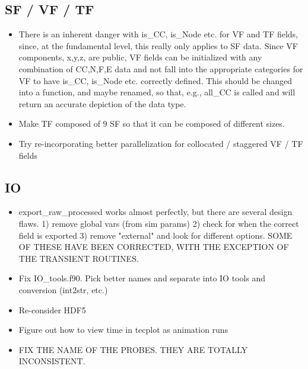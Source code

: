 \documentclass[11pt]{article}
\begin{document}
\subsection{SF / VF / TF}
\begin{itemize}
\setlength\itemsep{-1em}
\item There is an inherent danger with is\_CC, is\_Node etc. for VF and TF fields, since, at the fundamental level, this really only applies to SF data. Since VF components, x,y,z, are public, VF fields can be initialized with any combination of CC,N,F,E data and not fall into the appropriate categories for VF to have is\_CC, is\_Node etc. correctly defined. This should be changed into a function, and maybe renamed, so that, e.g., all\_CC is called and will return an accurate depiction of the data type.
\item Make TF composed of 9 SF so that it can be composed of different sizes.
\item Try re-incorporating better parallelization for collocated / staggered VF / TF fields
\end{itemize}

\subsection{IO}
\begin{itemize}
\setlength\itemsep{-1em}
\item export\_raw\_processed works almost perfectly, but there are several design flaws. 1) remove global vars (from sim params) 2) check for when the correct field is exported 3) remove "external" and look for different options. SOME OF THESE HAVE BEEN CORRECTED, WITH THE EXCEPTION OF THE TRANSIENT ROUTINES.
\item Fix IO\_tools.f90. Pick better names and separate into IO tools and conversion (int2str, etc.)
\item Re-consider HDF5
\item Figure out how to view time in tecplot as animation runs
\item FIX THE NAME OF THE PROBES. THEY ARE TOTALLY INCONSISTENT.
\end{itemize}
\end{document}
